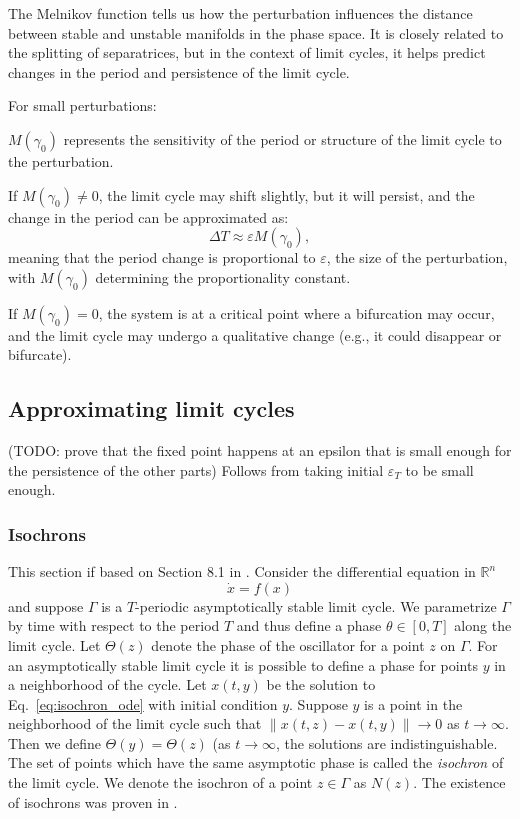 \documentclass{article}
\newcommand{\ascomment}[1]{\textcolor{ascolor}{(#1)}}
\newcommand{\reals}{\mathbb{R}}
\newcounter{ct}
\begin{document}
The Melnikov function tells us how the perturbation influences the distance between stable and unstable manifolds in the phase space. It is closely related to the splitting of separatrices, but in the context of limit cycles, it helps predict changes in the period and persistence of the limit cycle.

For small perturbations:

\(M(\gamma_0)\) represents the sensitivity of the period or structure of the limit cycle to the perturbation.

If \(M(\gamma_0) \neq 0\), the limit cycle may shift slightly, but it will persist, and the change in the period can be approximated as:
\[
\Delta T \approx \varepsilon M(\gamma_0),
\]
meaning that the period change is proportional to \(\varepsilon\), the size of the perturbation, with \(M(\gamma_0)\) determining the proportionality constant.

If \(M(\gamma_0) = 0\), the system is at a critical point where a bifurcation may occur, and the limit cycle may undergo a qualitative change (e.g., it could disappear or bifurcate).


\subsection{Approximating limit cycles}\label{sec:lc_extras}
\ascomment{TODO: prove that the fixed point happens at an epsilon that is small enough for the persistence of the other parts}
Follows from taking initial $\varepsilon_T$ to be small enough.


\subsubsection{Isochrons}%
This section if based on Section 8.1 in  \citep{ermentrout2010mathematical}.
Consider the differential equation in $\reals^n$
\begin{equation}\label{eq:isochron_ode}
\dot x = f(x)
\end{equation}
and suppose $\Gamma$ is a $T$-periodic asymptotically stable limit cycle.
We parametrize $\Gamma$ by time with respect to the period $T$ and thus define a phase $\theta\in[0,T]$ along the limit cycle.
Let $\Theta(z)$ denote the phase of the oscillator for a point $z$ on $\Gamma$.
For an asymptotically stable limit cycle it is possible to define a phase for points $y$ in a neighborhood of the cycle.
Let $x(t,y)$ be the solution to Eq.~\ref{eq:isochron_ode} with initial condition $y$. 
Suppose $y$ is a point in the neighborhood of the limit cycle such that $\|x(t,z) - x(t,y)\|\rightarrow 0$ as $t\rightarrow \infty$.
Then we define $\Theta(y) = \Theta(z)$ (as $t\rightarrow\infty$, the solutions are indistinguishable.
The set of points which have the same asymptotic phase is called the \emph{isochron} of the limit cycle.
We denote the isochron of a point $z\in \Gamma$ as $N(z) $.
The existence of isochrons was proven in  \citep{guckenheimer1975isochrons}.
\end{document}
